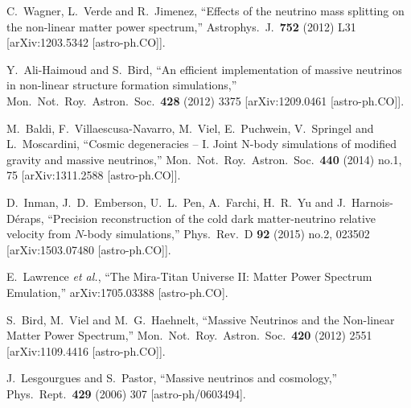 \documentclass[11pt,a4paper]{article}
\renewcommand\({\left(}
\renewcommand\){\right)}
\renewcommand\[{\left[}
\renewcommand\]{\right]}
\begin{document}
\begin{thebibliography}{10}
  C.~Wagner, L.~Verde and R.~Jimenez,
  ``Effects of the neutrino mass splitting on the non-linear matter power spectrum,''
  Astrophys.\ J.\  {\bf 752} (2012) L31
  [arXiv:1203.5342 [astro-ph.CO]].
	
  Y.~Ali-Haimoud and S.~Bird,
  ``An efficient implementation of massive neutrinos in non-linear structure formation simulations,''
  Mon.\ Not.\ Roy.\ Astron.\ Soc.\  {\bf 428} (2012) 3375
  [arXiv:1209.0461 [astro-ph.CO]].
	
  M.~Baldi, F.~Villaescusa-Navarro, M.~Viel, E.~Puchwein, V.~Springel and L.~Moscardini,
  ``Cosmic degeneracies – I. Joint N-body simulations of modified gravity and massive neutrinos,''
  Mon.\ Not.\ Roy.\ Astron.\ Soc.\  {\bf 440} (2014) no.1,  75
  [arXiv:1311.2588 [astro-ph.CO]].
	
  D.~Inman, J.~D.~Emberson, U.~L.~Pen, A.~Farchi, H.~R.~Yu and J.~Harnois-Déraps,
  ``Precision reconstruction of the cold dark matter-neutrino relative velocity from $N$-body simulations,''
  Phys.\ Rev.\ D {\bf 92} (2015) no.2,  023502
  [arXiv:1503.07480 [astro-ph.CO]].
	
  E.~Lawrence {\it et al.},
  ``The Mira-Titan Universe II: Matter Power Spectrum Emulation,''
  arXiv:1705.03388 [astro-ph.CO].

  S.~Bird, M.~Viel and M.~G.~Haehnelt,
  ``Massive Neutrinos and the Non-linear Matter Power Spectrum,''
  Mon.\ Not.\ Roy.\ Astron.\ Soc.\  {\bf 420} (2012) 2551
  [arXiv:1109.4416 [astro-ph.CO]].

  J.~Lesgourgues and S.~Pastor,
``Massive neutrinos and cosmology,''
  Phys.\ Rept.\  {\bf 429} (2006) 307
  [astro-ph/0603494].
  

\end{thebibliography}
\end{document}
